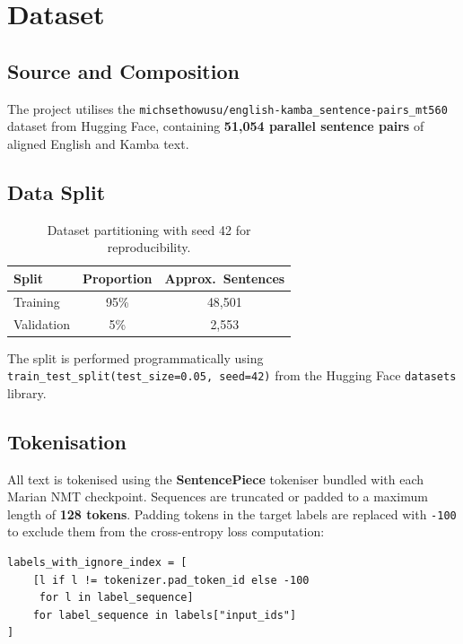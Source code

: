 \documentclass[12pt,a4paper]{article}
\begin{document}
\section{Dataset}

\subsection{Source and Composition}

The project utilises the \texttt{michsethowusu/english-kamba\_sentence-pairs\_mt560} dataset from Hugging Face, containing \textbf{51,054 parallel sentence pairs} of aligned English and Kamba text.

\subsection{Data Split}

\begin{table}[H]
\centering
\begin{tabular}{@{}lcc@{}}
\toprule
\textbf{Split} & \textbf{Proportion} & \textbf{Approx.\ Sentences} \\
\midrule
Training   & 95\% & 48,501 \\
Validation & 5\%  & 2,553 \\
\bottomrule
\end{tabular}
\caption{Dataset partitioning with seed 42 for reproducibility.}
\end{table}

The split is performed programmatically using \texttt{train\_test\_split(test\_size=0.05, seed=42)} from the Hugging Face \texttt{datasets} library.

\subsection{Tokenisation}

All text is tokenised using the \textbf{SentencePiece} tokeniser bundled with each Marian NMT checkpoint. Sequences are truncated or padded to a maximum length of \textbf{128 tokens}. Padding tokens in the target labels are replaced with \texttt{-100} to exclude them from the cross-entropy loss computation:

\begin{lstlisting}
labels_with_ignore_index = [
    [l if l != tokenizer.pad_token_id else -100
     for l in label_sequence]
    for label_sequence in labels["input_ids"]
]
\end{lstlisting}
\end{document}
